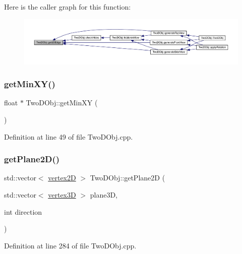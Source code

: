 Here is the caller graph for this function\+:
\nopagebreak
\begin{figure}[H]
\begin{center}
\leavevmode
\includegraphics[width=350pt]{class_two_d_obj_a1cd226f2becc270af54e16265f9b3b55_icgraph}
\end{center}
\end{figure}
\mbox{\label{class_two_d_obj_ab6d468aec6681bef559fc2f222d7063a}} 
\subsubsection{\texorpdfstring{get\+Min\+X\+Y()}{getMinXY()}}
{\footnotesize\ttfamily float $\ast$ Two\+D\+Obj\+::get\+Min\+XY (\begin{DoxyParamCaption}{ }\end{DoxyParamCaption})}



Definition at line 49 of file Two\+D\+Obj.\+cpp.

\mbox{\label{class_two_d_obj_a265505612ca1a250f29052cb303d7762}} 
\subsubsection{\texorpdfstring{get\+Plane2\+D()}{getPlane2D()}}
{\footnotesize\ttfamily std\+::vector$<$ \mbox{\hyperlink{structvertex2_d}{vertex2D}} $>$ Two\+D\+Obj\+::get\+Plane2D (\begin{DoxyParamCaption}\item[{std\+::vector$<$ \mbox{\hyperlink{structvertex3_d}{vertex3D}} $>$}]{plane3D,  }\item[{int}]{direction }\end{DoxyParamCaption})}



Definition at line 284 of file Two\+D\+Obj.\+cpp.


